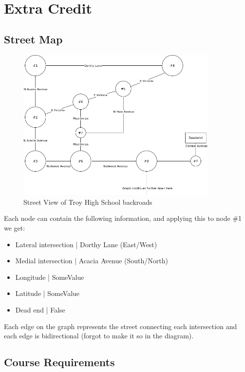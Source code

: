\documentclass{article}
\begin{document}
\newpage

\section{Extra Credit}

\subsection{Street Map}

\begin{figure}[!h]
\centering
\includegraphics[width=10cm]{StreetMap}
\caption{Street View of Troy High School backroads}
\end{figure}

Each node can contain the following information, and applying this to node \#1 we get:

\begin{itemize}
\item Lateral intersection | Dorthy Lane (East/West)
\item Medial intersection | Acacia Avenue (South/North)
\item Longitude | SomeValue
\item Latitude | SomeValue
\item Dead end | False
\end{itemize}

Each edge on the graph represents the street connecting each intersection and each edge is bidirectional (forgot to make it so in the diagram).

\newpage

\subsection{Course Requirements}
\end{document}
